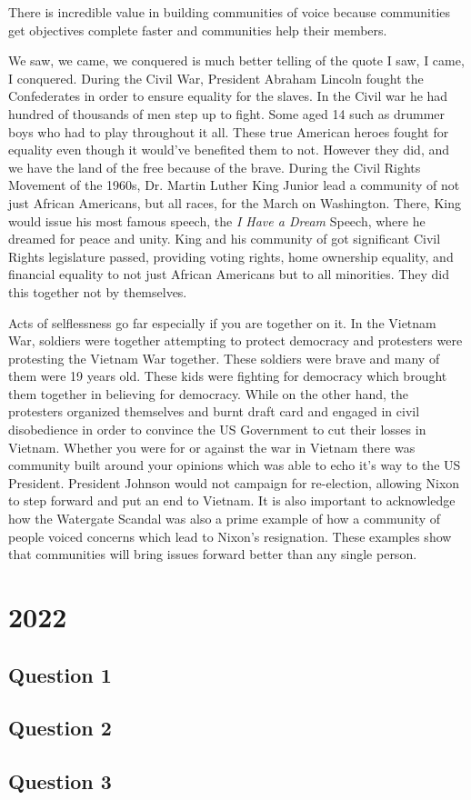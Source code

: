 \documentclass[10pt]{article}
\begin{document}
There is incredible value in building communities of voice because communities get objectives complete faster and communities help their members.

We saw, we came, we conquered is much better telling of the quote I saw, I came, I conquered. During the Civil War, President Abraham Lincoln fought the Confederates in order to ensure equality for the slaves. In the Civil war he had hundred of thousands of men step up to fight. Some aged 14 such as drummer boys who had to play throughout it all. These true American heroes fought for equality even though it would've benefited them to not. However they did, and we have the land of the free because of the brave. During the Civil Rights Movement of the 1960s, Dr. Martin Luther King Junior lead a community of not just African Americans, but all races, for the March on Washington. There, King would issue his most famous speech, the \textit{I Have a Dream} Speech, where he dreamed for peace and unity. King and his community of got significant Civil Rights legislature passed, providing voting rights, home ownership equality, and financial equality to not just African Americans but to all minorities. They did this together not by themselves.

Acts of selflessness go far especially if you are together on it. In the Vietnam War, soldiers were together attempting to protect democracy and protesters were protesting the Vietnam War together. These soldiers were brave and many of them were 19 years old. These kids were fighting for democracy which brought them together in believing for democracy. While on the other hand, the protesters organized themselves and burnt draft card and engaged in civil disobedience in order to convince the US Government to cut their losses in Vietnam. Whether you were for or against the war in Vietnam there was community built around your opinions which was able to echo it's way to the US President. President Johnson would not campaign for re-election, allowing Nixon to step forward and put an end to Vietnam. It is also important to acknowledge how the Watergate Scandal was also a prime example of how a community of people voiced concerns which lead to Nixon's resignation. These examples show that communities will bring issues forward better than any single person.

\section{2022}

\subsection{Question 1}

\subsection{Question 2}

\subsection{Question 3}
\end{document}
